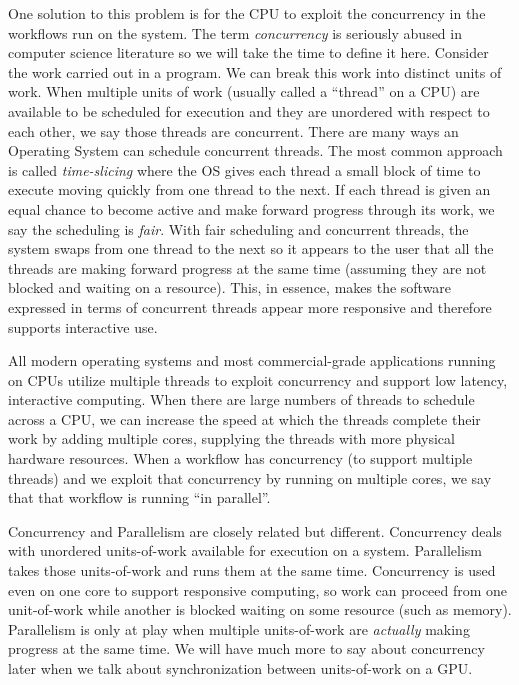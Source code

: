 One solution to this problem is for the CPU to exploit the concurrency in the workflows run on the system.
The term \emph{concurrency} is seriously abused in computer science literature so we will
take the time to define it here.   Consider the work carried out in a program.   We can break this work into 
distinct units of work.  When multiple units of work (usually called a ``thread'' on a CPU) are 
available to be scheduled for execution and they are unordered with respect to each other, we say those threads are concurrent.  
There are many ways an Operating System can schedule concurrent threads.  
The most common approach is called \emph{time-slicing} where the OS gives
each thread a small block of time to execute moving quickly from one thread to the next.  
If each thread is given an equal chance
to become active and make forward progress through its work, we say the scheduling is \emph{fair}.  With fair scheduling
and concurrent threads, the system swaps from one thread to the next so it appears to the user that all the threads
are making forward progress at the same time (assuming they are not blocked and waiting on a resource).   This, in essence, makes the
software expressed in terms of concurrent threads appear more responsive and therefore supports interactive use.

All modern operating systems and most commercial-grade applications running on CPUs utilize multiple threads to
exploit concurrency and support low latency, interactive computing.  When there are large numbers
of threads to schedule across a CPU, we can increase the speed at which the threads complete their work by adding multiple 
cores, supplying the threads with more physical hardware resources.  When a workflow has concurrency (to support multiple threads) and we exploit that concurrency by running on 
multiple cores, we say that that workflow is running ``in parallel''.  

Concurrency and Parallelism are closely related but 
different.  Concurrency deals with unordered units-of-work available for execution on a system.  Parallelism takes those  
units-of-work and runs them at the same time.  Concurrency is used even on one core to support 
responsive computing, so work can proceed from one unit-of-work while another is blocked waiting on some resource (such as 
memory).  Parallelism is only at play when multiple units-of-work are \emph{actually} making progress at the same time.  We will have 
much more to say about concurrency later when we talk about synchronization between units-of-work on a GPU.

